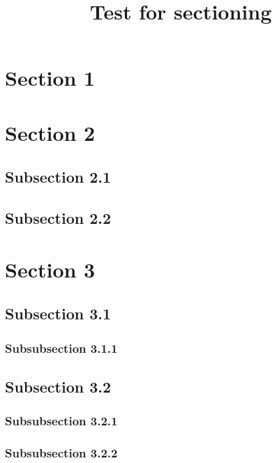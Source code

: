 \usepackage{lipsum}

\title{Test for sectioning}
\author{}
\date{}


\maketitle
\tableofcontents



\lipsum[1-1]

\section{Section 1}

\lipsum[2-3]

\section{Section 2}

\subsection{Subsection 2.1}

\lipsum[4-6]

\subsection{Subsection 2.2}

\lipsum[7-9]

\section{Section 3}

\lipsum[10-12]

\subsection{Subsection 3.1}

\subsubsection{Subsubsection 3.1.1}

\lipsum[13-15]

\subsection{Subsection 3.2}

\lipsum[16-18]

\subsubsection{Subsubsection 3.2.1}

\lipsum[19-21]

\subsubsection{Subsubsection 3.2.2}

\lipsum[22-23]


